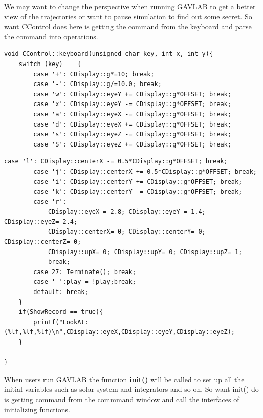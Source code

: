 \documentclass[12pt]{article}
\begin{document}
We may want to change the perspective when running GAVLAB to get a better view of 
the trajectories or want to pause simulation to find out some secret.
So want CControl does here is getting the command from the keyboard and
parse the command into operations.
\begin{lstlisting}[caption=keyboard() Part I]
void CControl::keyboard(unsigned char key, int x, int y){
    switch (key)    {
        case '+': CDisplay::g*=10; break;
        case '-': CDisplay::g/=10.0; break;
        case 'w': CDisplay::eyeY += CDisplay::g*OFFSET; break;
        case 'x': CDisplay::eyeY -= CDisplay::g*OFFSET; break;
        case 'a': CDisplay::eyeX -= CDisplay::g*OFFSET; break;
        case 'd': CDisplay::eyeX += CDisplay::g*OFFSET; break;
        case 's': CDisplay::eyeZ -= CDisplay::g*OFFSET; break;
        case 'S': CDisplay::eyeZ += CDisplay::g*OFFSET; break;
\end{lstlisting}
\clearpage
\begin{lstlisting}[caption=keyboard() Part II]
        case 'l': CDisplay::centerX -= 0.5*CDisplay::g*OFFSET; break;
        case 'j': CDisplay::centerX += 0.5*CDisplay::g*OFFSET; break;
        case 'i': CDisplay::centerY += CDisplay::g*OFFSET; break;
        case 'k': CDisplay::centerY -= CDisplay::g*OFFSET; break;
        case 'r':
            CDisplay::eyeX = 2.8; CDisplay::eyeY = 1.4; CDisplay::eyeZ= 2.4;
            CDisplay::centerX= 0; CDisplay::centerY= 0; CDisplay::centerZ= 0;
            CDisplay::upX= 0; CDisplay::upY= 0; CDisplay::upZ= 1;
            break;
        case 27: Terminate(); break;
        case ' ':play = !play;break;
        default: break;
    }
    if(ShowRecord == true){
        printf("LookAt:(%lf,%lf,%lf)\n",CDisplay::eyeX,CDisplay::eyeY,CDisplay::eyeZ);
    }
    
}
\end{lstlisting}

When users run GAVLAB the function \textbf{init()} will be called to set up all the initial variables such as 
solar system and integrators and so on.
So want init() do is getting command from the commmand window and call the interfaces of initializing functions.
\end{document}
